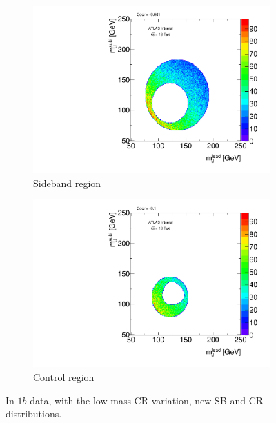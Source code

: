 \begin{figure}[htbp!]
\centering
\captionsetup{justification=centering}
    \begin{subfigure}[b]{0.39\textwidth}
        \includegraphics[width=\textwidth,angle=-90]{figures/boosted/Syst_CRSB/CR_Low_Sideband_OneTag_mH0H1.pdf}
        \caption{Sideband region}
        \label{CRSB:CR_Low_SB}
    \end{subfigure}
    \quad
    \begin{subfigure}[b]{0.39\textwidth}
        \includegraphics[width=\textwidth,angle=-90]{figures/boosted/Syst_CRSB/CR_Low_Control_OneTag_mH0H1.pdf}
        \caption{Control region}
        \label{CRSB:CR_Low_CR}
    \end{subfigure}
\caption{In $1b$ data, with the low-mass CR variation, new SB and CR \mleadJ-\msublJ~ distributions.}
\label{CRSB:CR_Low}
\end{figure}


